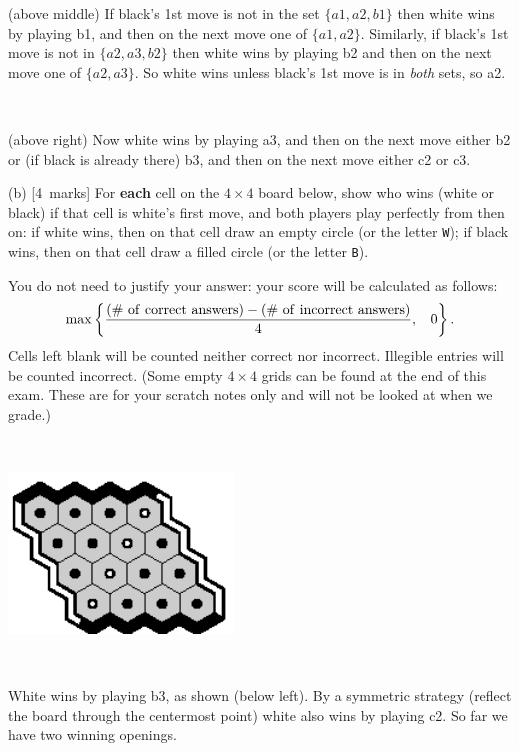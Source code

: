 \documentclass[12pt]{article}
\newcommand{\mymarks}[1]{\mbox{\small [#1 marks]}}
\begin{document}
(above middle)
If black's 1st move is not in the set $\{a1,a2,b1\}$ then
white wins by playing b1, and then on the next move
one of $\{a1,a2\}$. Similarly, if black's 1st move is not
in $\{a2,a3,b2\}$ then white wins by playing b2
and then on the next move one of $\{a2,a3\}$.
So white wins unless black's 1st move is in {\em both} sets, so a2.

~

(above right)
Now white wins by playing a3, and then on the next move
either b2 or (if black is already there) b3, and then 
on the next move either c2 or c3.
\vfill~

\newpage
(b) \mymarks{4}
For {\bf each} cell on the $4 \times 4$ board below, 
show who wins (white or black) if that cell is white's first move,
and both players play perfectly from then on:
if white wins, then on that cell draw an empty circle
(or the letter \texttt{W}); 
if black wins, then on that cell draw a filled circle 
(or the letter \texttt{B}).

You do not need to justify your answer:
your score will be calculated as follows:
\[ \max\left\{\frac{({\rm \#~of~correct~answers}) - ({\rm \#~of~incorrect~answers})}{4}, \:\:\:\: 0\right\}. \]
Cells left blank will be counted neither correct nor incorrect.
Illegible entries will be counted incorrect.
(Some empty $4 \times 4$ grids can be found at the end of this exam. These are for your scratch notes only and will not be looked at when we grade.)

~


\begin{center}
\includegraphics[width=60mm]{fz/pix/4x4.winners.eps}\
\end{center}

~

White wins by playing b3, as shown (below left).
By a symmetric strategy (reflect the board through the 
centermost point) white also wins by playing c2.
So far we have two winning openings.

~
\end{document}
